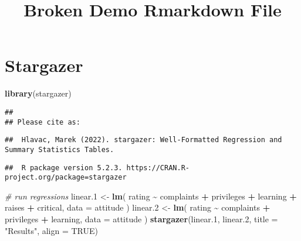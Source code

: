 \documentclass[
]{article}
\title{Broken Demo Rmarkdown File}
\author{}
\date{\vspace{-2.5em}}
\newenvironment{Shaded}{\begin{snugshade}}{\end{snugshade}}
\newcommand{\AttributeTok}[1]{\textcolor[rgb]{0.13,0.29,0.53}{#1}}
\newcommand{\CommentTok}[1]{\textcolor[rgb]{0.56,0.35,0.01}{\textit{#1}}}
\newcommand{\ConstantTok}[1]{\textcolor[rgb]{0.56,0.35,0.01}{#1}}
\newcommand{\FloatTok}[1]{\textcolor[rgb]{0.00,0.00,0.81}{#1}}
\newcommand{\FunctionTok}[1]{\textcolor[rgb]{0.13,0.29,0.53}{\textbf{#1}}}
\newcommand{\NormalTok}[1]{#1}
\newcommand{\OtherTok}[1]{\textcolor[rgb]{0.56,0.35,0.01}{#1}}
\newcommand{\SpecialCharTok}[1]{\textcolor[rgb]{0.81,0.36,0.00}{\textbf{#1}}}
\newcommand{\StringTok}[1]{\textcolor[rgb]{0.31,0.60,0.02}{#1}}
\begin{document}
\maketitle

\section{Stargazer}\label{stargazer}

\begin{Shaded}
\begin{Highlighting}[]
\FunctionTok{library}\NormalTok{(stargazer)}
\end{Highlighting}
\end{Shaded}

\begin{verbatim}
## 
## Please cite as:
\end{verbatim}

\begin{verbatim}
##  Hlavac, Marek (2022). stargazer: Well-Formatted Regression and Summary Statistics Tables.
\end{verbatim}

\begin{verbatim}
##  R package version 5.2.3. https://CRAN.R-project.org/package=stargazer
\end{verbatim}

\begin{Shaded}
\begin{Highlighting}[]
\CommentTok{\# run regressions}
\NormalTok{linear}\FloatTok{.1} \OtherTok{\textless{}{-}} \FunctionTok{lm}\NormalTok{(}
\NormalTok{  rating }\SpecialCharTok{\textasciitilde{}}\NormalTok{ complaints }\SpecialCharTok{+}\NormalTok{ privileges }\SpecialCharTok{+}\NormalTok{ learning }\SpecialCharTok{+}\NormalTok{ raises }\SpecialCharTok{+}\NormalTok{ critical,}
  \AttributeTok{data =}\NormalTok{ attitude}
\NormalTok{)}
\NormalTok{linear}\FloatTok{.2} \OtherTok{\textless{}{-}} \FunctionTok{lm}\NormalTok{(}
\NormalTok{  rating }\SpecialCharTok{\textasciitilde{}}\NormalTok{ complaints }\SpecialCharTok{+}\NormalTok{ privileges }\SpecialCharTok{+}\NormalTok{ learning, }\AttributeTok{data =}\NormalTok{ attitude}
\NormalTok{)}
\FunctionTok{stargazer}\NormalTok{(linear}\FloatTok{.1}\NormalTok{, linear}\FloatTok{.2}\NormalTok{, }\AttributeTok{title =} \StringTok{"Results"}\NormalTok{, }\AttributeTok{align =} \ConstantTok{TRUE}\NormalTok{)}
\end{Highlighting}
\end{Shaded}
\end{document}
